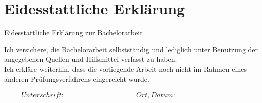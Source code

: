 \thispagestyle{empty}
\section*{Eidesstattliche Erkl{\"{a}}rung}

\vspace*{1cm}

\begin{LARGE}
    Eidesstattliche Erkl{\"{a}}rung zur Bachelorarbeit
\end{LARGE}

\vspace*{1cm}

\noindent
Ich versichere, die Bachelorarbeit selbstst{\"{a}}ndig und lediglich unter Benutzung der angegebenen Quellen und Hilfsmittel verfasst zu haben. \\

\noindent
Ich erkl{\"{a}}re weiterhin, dass die vorliegende Arbeit noch nicht im Rahmen eines anderen Pr{\"{u}}fungsverfahrens eingereicht wurde.

\begin{displaymath}
\begin{array}{ll}
Unterschrift:~~~~~~~~~~~~~~~~~~~~~~~~~~~~~~~~~~~~~~~~~~
& Ort, Datum:~~~~~~~~~~~~~~~~~~~~~~~~~~~~~~~~~~~~~~~~~~
\end{array}
\end{displaymath}

